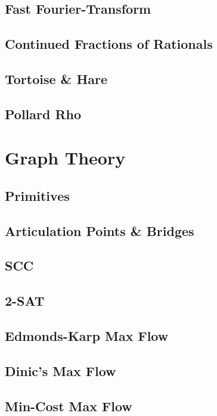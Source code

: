 		\subsection{Fast Fourier-Transform}
			
		\subsection{Continued Fractions of Rationals}
			
		\subsection{Tortoise \& Hare}
			
		\subsection{Pollard Rho}
			
	\section{Graph Theory}
		\subsection{Primitives}
			
		\subsection{Articulation Points \& Bridges}
			
		\subsection{SCC}
			
		\subsection{2-SAT}
			
		\subsection{Edmonds-Karp Max Flow}
			
		\subsection{Dinic's Max Flow}
			
		\subsection{Min-Cost Max Flow}
			
